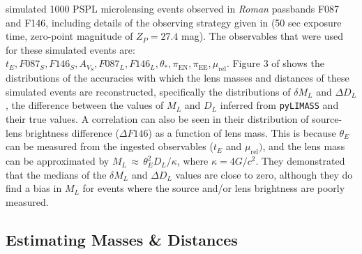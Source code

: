 \documentclass[twocolumn]{aastex631}
\begin{document}
\indent \cite{bachelet:2024a} simulated 1000 PSPL microlensing events observed in \textit{Roman} passbands F087 and F146, including details of the observing strategy given in \cite{penny19} (50 sec exposure time, zero-point magnitude of $Z_P=27.4$ mag). The observables that were used for these simulated events are: $t_E, F087_S, F146_S, A_{V_S}, F087_L, F146_L, \theta_*, \pi_{\textrm{EN}}, \pi_{\textrm{EE}}, \mu_{\textrm{rel}}$. Figure 3 of \cite{bachelet:2024a} shows the distributions of the accuracies with which the lens masses and distances of these simulated events are reconstructed, specifically the distributions of $\delta M_L$ and $\Delta D_L$, the difference between the values of $M_L$ and $D_L$ inferred from \texttt{pyLIMASS} and their true values. A correlation can also be seen in their distribution of source-lens brightness difference ($\Delta F146$) as a function of lens mass. This is because $\theta_E$ can be measured from the ingested observables ($t_E$ and $\mu_{\textrm{rel}})$, and the lens mass can be approximated by $M_L\,{\approx}\, \theta_{E}^2 D_L/\kappa$, where $\kappa = 4G/c^2$. They demonstrated that the medians of the $\delta M_L$ and $\Delta D_L$ values are close to zero, although they do find a bias in $M_L$ for events where the source and/or lens brightness are poorly measured.\\

\subsection{Estimating Masses \& Distances} \label{subsec:ml-dl-pylimass}
\end{document}
